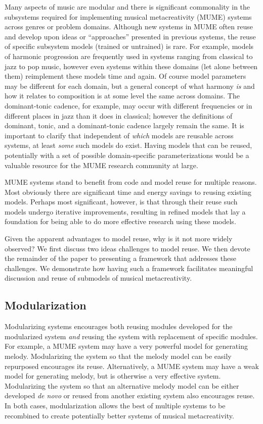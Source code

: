 \documentclass[letterpaper]{article}
\begin{document}
Many aspects of music are modular and there is significant commonality in the subsystems required for implementing musical metacreativity (MUME) systems across genres or problem domains. Although new systems in MUME often reuse and develop upon ideas or ``approaches'' presented in previous systems, the reuse of specific subsystem models (trained or untrained) is rare. For example, models of harmonic progression are frequently used in systems ranging from classical to jazz to pop music, however even systems within these domains (let alone between them) reimplement these models time and again. Of course model parameters may be different for each domain, but a general concept of what harmony \emph{is} and how it relates to composition is at some level the same across domains. The dominant-tonic cadence, for example, may occur with different frequencies or in different places in jazz than it does in classical; however the definitions of dominant, tonic, and a dominant-tonic cadence largely remain the same. It is important to clarify that independent of \emph{which} models are reusable across systems, at least \emph{some} such models do exist. Having models that can be reused, potentially with a set of possible domain-specific parameterizations would be a valuable resource for the MUME research community at large.

MUME systems stand to benefit from code and model reuse for multiple reasons. Most obviously there are significant time and energy savings to reusing existing models. Perhaps most significant, however, is that through their reuse such models undergo iterative improvements, resulting in refined models that lay a foundation for being able to do more effective research using these models.

Given the apparent advantages to model reuse, why is it not more widely observed? We first discuss two ideas challenges to model reuse. We then devote the remainder of the paper to presenting a framework that addresses these challenges. We demonstrate how having such a framework facilitates meaningful discussion and reuse of submodels of musical metacreativity. 

\subsection{Modularization}

Modularizing systems encourages both reusing modules developed for the modularized system \emph{and} reusing the system with replacement of specific modules. For example, a MUME system may have a very powerful model for generating melody. Modularizing the system so that the melody model can be easily repurposed encourages its reuse. Alternatively, a MUME system may have a weak model for generating melody, but is otherwise a very effective system. Modularizing the system so that an alternative melody model can be either developed \emph{de novo} or reused from another existing system also encourages reuse. In both cases, modularization allows the best of multiple systems to be recombined to create potentially better systems of musical metacreativity.
\end{document}
